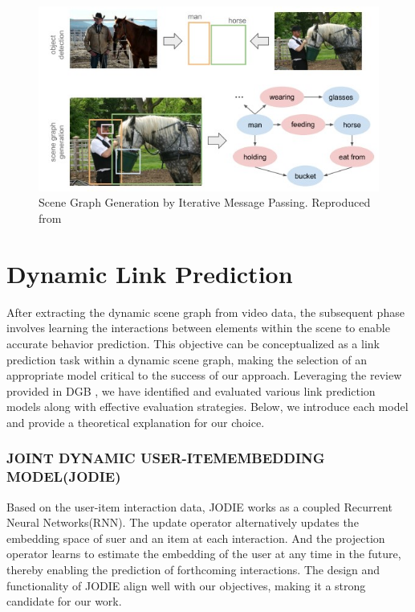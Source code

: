 \begin{figure}
    \centering
    \includegraphics[width=\linewidth]{figures/03_SGG.jpg}
    \caption{Scene Graph Generation by Iterative Message Passing. Reproduced from\cite{tang2020unbiased}}
    \label{fig:SGG}
\end{figure}

\section{Dynamic Link Prediction}


After extracting the dynamic scene graph from video data, the subsequent phase involves learning the interactions between elements within the scene to enable accurate behavior prediction. This objective can be conceptualized as a link prediction task within a dynamic scene graph, making the selection of an appropriate model critical to the success of our approach. Leveraging the review provided in DGB \cite{poursafaei2022towards}, we have identified and evaluated various link prediction models along with effective evaluation strategies. Below, we introduce each model and provide a theoretical explanation for our choice.

\subsubsection{ JOINT DYNAMIC USER-ITEMEMBEDDING MODEL(JODIE)}
Based on the user-item interaction data, JODIE\cite{kumar2019predicting} works as a coupled Recurrent Neural Networks(RNN). The update operator alternatively updates the embedding space of suer and an item at each interaction. And the projection operator learns to estimate the embedding of the user at any time in the future, thereby enabling the prediction of forthcoming interactions. The design and functionality of JODIE align well with our objectives, making it a strong candidate for our work.

